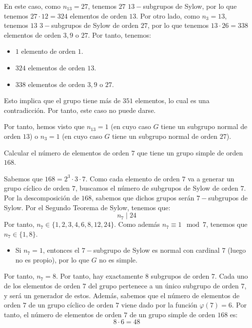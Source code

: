 \begin{ejercicio}
\begin{enumerate}
\begin{itemize}
\begin{itemize}
                En este caso, como $n_{13}=27$, tenemos $27$ $13-$subgrupos de Sylow, por lo que tenemos $27\cdot 12=324$ elementos de orden $13$. Por otro lado, como $n_3=13$, tenemos $13$ $3-$subgrupos de Sylow de orden $27$, por lo que tenemos $13\cdot 26=338$ elementos de orden $3,9$ o $27$. Por tanto, tenemos:
                \begin{itemize}
                    \item $1$ elemento de orden $1$.
                    \item $324$ elementos de orden $13$.
                    \item $338$ elementos de orden $3,9$ o $27$.
                \end{itemize}
                Esto implica que el grupo tiene más de $351$ elementos, lo cual es una contradicción. Por tanto, este caso no puede darse.
            \end{itemize}
        \end{itemize}

        Por tanto, hemos visto que $n_{13}=1$ (en cuyo caso $G$ tiene un subgrupo normal de orden $13$) o $n_3=1$ (en cuyo caso $G$ tiene un subgrupo normal de orden $27$).
    \end{enumerate}
\end{ejercicio}

\begin{ejercicio}\label{ej:6.25}
    Calcular el número de elementos de orden $7$ que tiene un grupo simple de orden $168$.


    Sabemos que $168=2^3\cdot 3\cdot 7$. Como cada elemento de orden $7$ va a generar un grupo cíclico de orden $7$, buscamos el número de subgrupos de Sylow de orden $7$. Por la descomposición de $168$, sabemos que dichos grupos serán $7-$subgrupos de Sylow. Por el Segundo Teorema de Sylow, tenemos que:
    \begin{equation*}
        n_7 \mid 24
    \end{equation*}
    Por tanto, $n_7\in \{1, 2, 3, 4, 6, 8, 12, 24\}$. Como además $n_7 \equiv 1 \mod 7$, tenemos que $n_7\in \{1, 8\}$.
    \begin{itemize}
        \item Si $n_7=1$, entonces el $7-$subgrupo de Sylow es normal con cardinal $7$ (luego no es propio), por lo que $G$ no es simple.
    \end{itemize}

    Por tanto, $n_7=8$. Por tanto, hay exactamente $8$ subgrupos de orden $7$. Cada uno de los elementos de orden $7$ del grupo pertenece a un único subgrupo de orden $7$, y será un generador de estos. Además, sabemos que el número de elementos de orden $7$ de un grupo cíclico de orden $7$ viene dado por la función $\varphi(7) = 6$. Por tanto, el número de elementos de orden $7$ de un grupo simple de orden $168$ es:
    \begin{equation*}
        8\cdot 6 = 48
    \end{equation*}
\end{ejercicio}